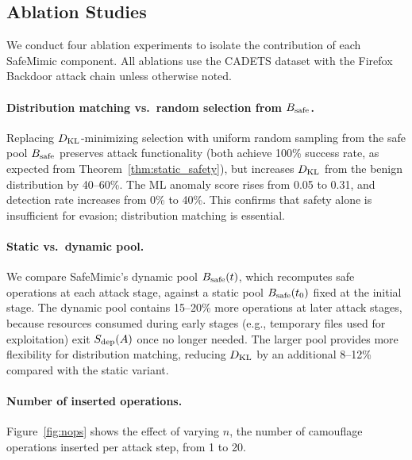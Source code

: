 \subsection{Ablation Studies}
\label{sec:eval:ablation}

We conduct four ablation experiments to isolate the contribution of each SafeMimic component.
All ablations use the CADETS dataset with the Firefox Backdoor attack chain unless otherwise noted.

\paragraph{Distribution matching vs.\ random selection from $B_{\text{safe}}$.}
Replacing $D_{\text{KL}}$-minimizing selection with uniform random sampling from the safe pool $B_{\text{safe}}$ preserves attack functionality (both achieve 100\% success rate, as expected from Theorem~\ref{thm:static_safety}), but increases $D_{\text{KL}}$ from the benign distribution by 40--60\%.
The ML anomaly score rises from 0.05 to 0.31, and detection rate increases from 0\% to 40\%.
This confirms that safety alone is insufficient for evasion; distribution matching is essential.

\paragraph{Static vs.\ dynamic pool.}
We compare SafeMimic's dynamic pool $B_{\text{safe}}(t)$, which recomputes safe operations at each attack stage, against a static pool $B_{\text{safe}}(t_0)$ fixed at the initial stage.
The dynamic pool contains 15--20\% more operations at later attack stages, because resources consumed during early stages (e.g., temporary files used for exploitation) exit $S_{\text{dep}}(A)$ once no longer needed.
The larger pool provides more flexibility for distribution matching, reducing $D_{\text{KL}}$ by an additional 8--12\% compared with the static variant.

\paragraph{Number of inserted operations.}
Figure~\ref{fig:nops} shows the effect of varying $n$, the number of camouflage operations inserted per attack step, from 1 to 20.

